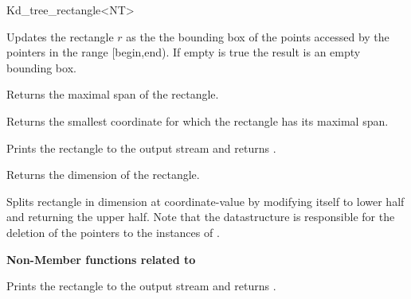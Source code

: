 \begin{ccRefClass}{Kd_tree_rectangle<NT>}
\begin{ccAdvanced}
{Updates the rectangle $r$ as the the bounding box of the points accessed by the pointers
 in the range [begin,end). If empty is true the result is an empty bounding box.} 
 
{Returns the maximal span of the rectangle.}

{Returns the smallest coordinate for which the rectangle has its maximal span.}

{Prints the rectangle to the output stream  and returns .}

{Returns the dimension of the rectangle.}

{Splits rectangle in dimension  at coordinate-value  
 by modifying itself to lower half and returning the upper half.
Note that the  datastructure is responsible for the
deletion of the pointers to the instances of .} 

{\bf Non-Member functions related to }

\ccGlueBegin
{} 
{Prints the rectangle  to the output stream  and returns .}
\ccGlueEnd


\end{ccAdvanced}

\end{ccRefClass}


